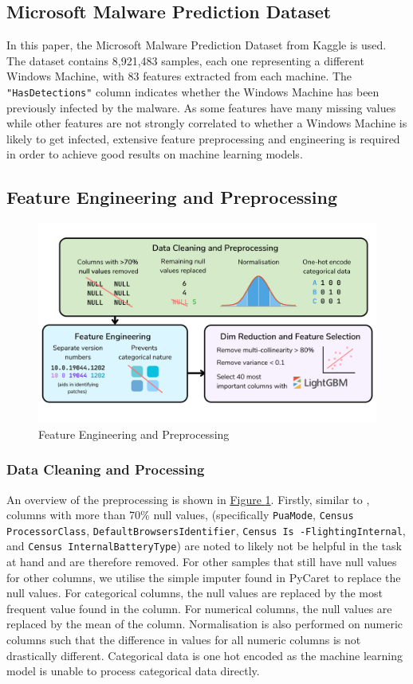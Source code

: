 \documentclass[pdflatex,sn-basic,Numbered]{sn-jnl}%
\theoremstyle{thmstyleone}%
\theoremstyle{thmstyletwo}%
\theoremstyle{thmstylethree}%
\newcommand{\reffig}[1]{\hyperref[#1]{Figure \ref*{#1}}}
\begin{document}
\subsection{Microsoft Malware Prediction Dataset}
In this paper, the Microsoft Malware Prediction Dataset from Kaggle \cite{microsoft-malware-prediction} is used. The dataset contains 8,921,483 samples, each one representing a different Windows Machine, with 83 features extracted from each machine. The \texttt{"HasDetections"} column indicates whether the Windows Machine has been previously infected by the malware. As some features have many missing values while other features are not strongly correlated to whether a Windows Machine is likely to get infected, extensive feature preprocessing and engineering is required in order to achieve good results on machine learning models. 
\subsection{Feature Engineering and Preprocessing}
\begin{figure}[h]
\includegraphics[scale=0.25]{images/feature_engineering.png}
\centering
\caption{Feature Engineering and Preprocessing}
\label{Fig 2}
\end{figure}
\subsubsection{Data Cleaning and Processing} 
An overview of the preprocessing is shown in \reffig{Fig 2}. Firstly, similar to \cite{shahini2019}, columns with more than 70\% null values, {(specifically \texttt{PuaMode}, \texttt{Census
ProcessorClass}, \texttt{DefaultBrowsersIdentifier}, \texttt{Census Is
-FlightingInternal}, and \texttt{Census InternalBatteryType})} are noted to likely not be helpful in the task at hand and are therefore removed. For other samples that still have null values for other columns, we utilise the simple imputer found in PyCaret to replace the null values. For categorical columns, the null values are replaced by the most frequent value found in the column. For numerical columns, the null values are replaced by the mean of the column. Normalisation is also performed on numeric columns such that the difference in values for all numeric columns is not drastically different. Categorical data is one hot encoded as the machine learning model is unable to process categorical data directly.
\end{document}
